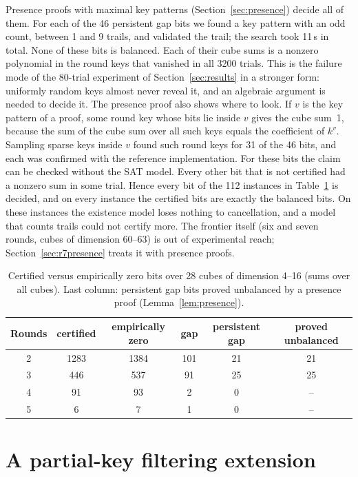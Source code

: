 \documentclass[pdflatex,sn-mathphys-num]{sn-jnl}
\theoremstyle{thmstyleone}
\theoremstyle{thmstylethree}
\theoremstyle{thmstyletwo}
\begin{document}
Presence proofs with maximal key patterns (Section~\ref{sec:presence}) decide all of them. For each of the 46 persistent gap bits we found a key pattern with an odd count, between 1 and 9 trails, and validated the trail; the search took 11\,s in total. None of these bits is balanced. Each of their cube sums is a nonzero polynomial in the round keys that vanished in all 3200 trials. This is the failure mode of the 80-trial experiment of Section~\ref{sec:results} in a stronger form: uniformly random keys almost never reveal it, and an algebraic argument is needed to decide it. The presence proof also shows where to look. If $v$ is the key pattern of a proof, some round key whose bits lie inside $v$ gives the cube sum~1, because the sum of the cube sum over all such keys equals the coefficient of $k^v$. Sampling sparse keys inside $v$ found such round keys for 31 of the 46 bits, and each was confirmed with the reference implementation. For these bits the claim can be checked without the SAT model. Every other bit that is not certified had a nonzero sum in some trial. Hence every bit of the 112 instances in Table~\ref{tab:tight} is decided, and on every instance the certified bits are exactly the balanced bits. On these instances the existence model loses nothing to cancellation, and a model that counts trails could not certify more. The frontier itself (six and seven rounds, cubes of dimension 60--63) is out of experimental reach; Section~\ref{sec:r7presence} treats it with presence proofs.

\begin{table}[t]\centering
\caption{Certified versus empirically zero bits over 28 cubes of dimension 4--16 (sums over all cubes). Last column: persistent gap bits proved unbalanced by a presence proof (Lemma~\ref{lem:presence}).}\label{tab:tight}
\begin{tabular}{cccccc}
\toprule
Rounds & certified & empirically zero & gap & persistent gap & proved unbalanced\\
\midrule
2 & 1283 & 1384 & 101 & 21 & 21\\
3 & 446 & 537 & 91 & 25 & 25\\
4 & 91 & 93 & 2 & 0 & --\\
5 & 6 & 7 & 1 & 0 & --\\
\bottomrule
\end{tabular}
\end{table}

\section{A partial-key filtering extension}\label{sec:keyrec}
\end{document}
